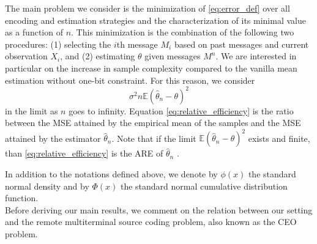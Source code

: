 \documentclass[letterpaper, conference,9pt]{IEEEtran}      %
\begin{document}
The main problem we consider is the minimization of \eqref{eq:error_def} over all encoding and estimation strategies and the characterization of its minimal value as a function of $n$. This minimization is the combination of the following two procedures: (1) selecting the $i$th message $M_i$ based on past messages and current observation $X_i$, and (2) estimating $\theta$ given messages $M^n$. 
%
We are interested in particular on the increase in sample complexity compared to the vanilla mean estimation without one-bit constraint. For this reason, we consider 
\begin{equation}
{\sigma^2} n \mathbb E\left(\widehat{\theta}_n - \theta \right)^2
\label{eq:relative_efficiency}
\end{equation}
in the limit as $n$ goes to infinity. Equation \eqref{eq:relative_efficiency} is the ratio between the MSE attained by the empirical mean of the samples and the MSE attained by the estimator $\widehat{\theta}_n$. Note that if the limit $\mathbb E\left(\widehat{\theta}_{n} - \theta \right)^2$ exists and finite, than \eqref{eq:relative_efficiency} is the ARE of $\widehat{\theta}_n$ \cite[Def. 6.6]{lehmann2006theory}. 


In addition to the notations defined above, we denote by $\phi(x)$ the standard normal density and by $\Phi(x)$ the standard normal cumulative distribution function. \\%

Before deriving our main results, we comment on the relation between our setting and the remote multiterminal source coding problem, also known as the CEO problem.
\end{document}
